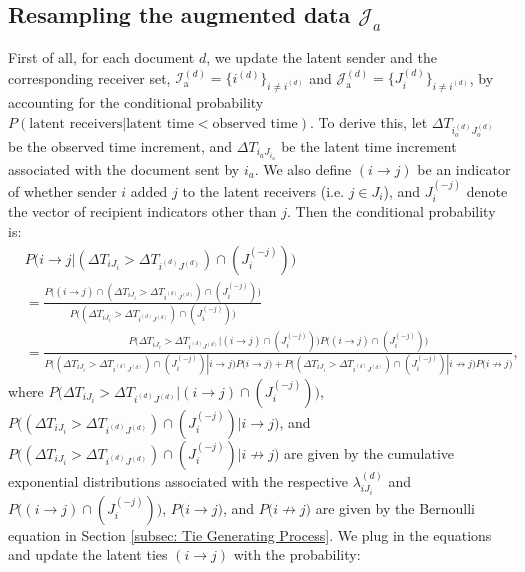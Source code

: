\documentclass[a4paper]{article}
\begin{document}
   \subsection{Resampling the augmented data $\mathcal{J}_a$} \label{subsec: Data augmentation}
   First of all, for each document $d$, we update the latent sender and the corresponding receiver set,  $\mathcal{I}^{(d)}_{\mbox{a}}=\{i^{(d)}\}_{i\neq i^{(d)}}$ and  $\mathcal{J}^{(d)}_{\mbox{a}}=\{J_i^{(d)}\}_{i\neq i^{(d)}}$, by accounting for the conditional probability $P(\mbox{latent receivers}| \mbox{latent time} < \mbox{observed time})$. To derive this, let $\Delta T_{i_o^{(d)}{J_o^{(d)}}}$ be the observed time increment, and $\Delta T_{i_a{J_{i_a}}}$ be the latent time increment associated with the document sent by $i_a$. We also define $(i \rightarrow j)$ be an indicator of whether sender $i$ added $j$ to the latent receivers (i.e. $j \in J_i$), and $J_i^{(-j)}$ denote the vector of recipient indicators other than $j$. Then the conditional probability is:\\
   \begin{equation}
   	\begin{split}
   		&P\Big(i \to j|(\Delta T_{i{J_i}} > \Delta T_{i^{(d)}{J^{(d)}}})\cap( J_i^{(-j)})\Big)\\ &=\frac{P\Big((i \rightarrow j)\cap (\Delta T_{i{J_i}} > \Delta T_{i^{(d)}{J^{(d)}}})\cap (J_i^{(-j)})\Big)}{P\Big((\Delta T_{i{J_i}} > \Delta T_{i^{(d)}{J^{(d)}}})\cap (J_i^{(-j)})\Big)}\\
   		& = \frac{P\Big(\Delta T_{i{J_i}} > \Delta T_{i^{(d)}{J^{(d)}}} | (i \to j)\cap (J_i^{(-j)})\Big)P\Big((i \to j) \cap (J_i^{(-j)})\Big)}{P\Big((\Delta T_{i{J_i}} > \Delta T_{i^{(d)}{J^{(d)}}})\cap (J_i^{(-j)})|i \to j\Big)P\Big(i \to j\Big)+P\Big( (\Delta T_{i{J_i}} > \Delta T_{i^{(d)}{J^{(d)}}}) \cap (J_i^{(-j)})|i \not\to j\Big)P\Big(i \not\to j\Big)},
   	\end{split}
   \end{equation}
   where $P\Big(\Delta T_{i{J_i}} > \Delta T_{i^{(d)}{J^{(d)}}} | (i \rightarrow j)\cap (J_i^{(-j)})\Big)$, $P\Big((\Delta T_{i{J_i}}> \Delta T_{i^{(d)}{J^{(d)}}})\cap (J_i^{(-j)})|i \rightarrow j\Big)$, and $P\Big((\Delta T_{i{J_i}}> \Delta T_{i^{(d)}{J^{(d)}}})\cap (J_i^{(-j)})|i\not\to j\Big)$ are given by the cumulative exponential distributions associated with the respective $\lambda^{(d)}_{iJ_i}$ and $P\Big((i \rightarrow j) \cap (J_i^{(-j)})\Big)$,  $P\Big(i \rightarrow j\Big)$, and $P\Big(i\not\to j\Big)$ are given by the Bernoulli equation in Section \ref{subsec: Tie Generating Process}. We plug in the equations and update the latent ties $(i \rightarrow j)$ with the probability:
\end{document}
